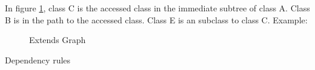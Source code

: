 \documentclass{cslthse-msc}
\begin{document}
In figure \ref{fig:extends}, class C is the accessed class in the immediate subtree of class A. Class B is in the path to the accessed class. Class E is an subclass to class C.
Example:
\begin{figure}[H]
    \centering
    \qquad
    \subfloat{{}}
    \caption{Extends Graph}
    \label{fig:extends}
\end{figure}
Dependency rules
\end{document}
